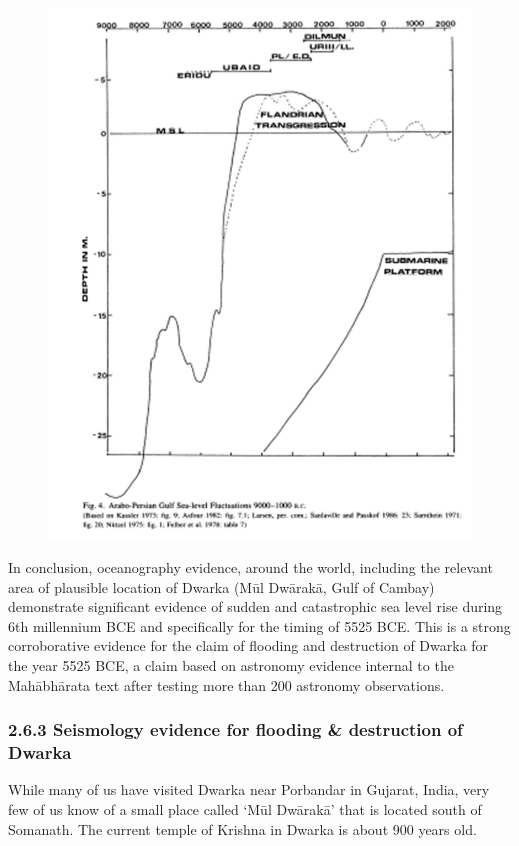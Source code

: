 \begin{figure}[!htbp]
\includegraphics[scale=0.33]{images/8-17.jpg}
\caption{}\label{art8-fig17}
\end{figure}

In conclusion, oceanography evidence, around the world, including the relevant area of plausible location of Dwarka (Mūl Dwārakā, Gulf of Cambay) demonstrate significant evidence of sudden and catastrophic sea level rise during 6th millennium BCE and specifically for the timing of 5525 BCE. This is a strong corroborative evidence for the claim of flooding and destruction of Dwarka for the year 5525 BCE, a claim based on astronomy evidence internal to the Mahābhārata text after testing more than 200 astronomy observations.


\subsubsection*{2.6.3 Seismology evidence for flooding \& destruction of Dwarka}

While many of us have visited Dwarka near Porbandar in Gujarat, India, very few of us know of a small place called ‘Mūl Dwārakā’ that is located south of Somanath. The current temple of Krishna in Dwarka is about 900 years old.

